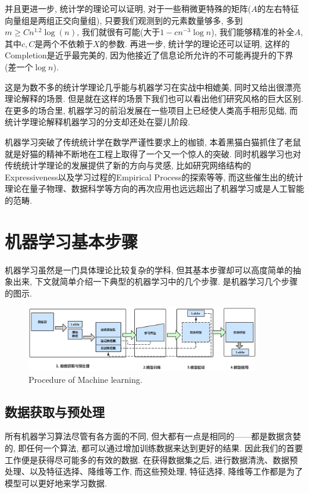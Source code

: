 \documentclass[lang=cn,11pt,a4paper]{elegantpaper}
\begin{document}
 \par 并且更进一步, 统计学的理论可以证明, 对于一些稍微更特殊的矩阵($A$的左右特征向量组是两组正交向量组), 只要我们观测到的元素数量够多, 多到$m\geq C n^{1.2} \log(n)$, 我们就很有可能(大于$1-cn^{-3}\log n$), 我们能够精准的补全$A$, 其中$c,C$是两个不依赖于$X$的参数\cite{Candes2009}. 再进一步, 统计学的理论还可以证明, 这样的Completion是近乎最完美的, 因为他接近了信息论所允许的不可能再提升的下界(差一个$\log n$)\cite{Candes2010}.
\par 这是为数不多的统计学理论几乎能与机器学习在实战中相媲美, 同时又给出很漂亮理论解释的场景. 但是就在这样的场景下我们也可以看出他们研究风格的巨大区别. 在更多的场合里, 机器学习的前沿发展在一些项目上已经使人类高手相形见绌, 而统计学理论解释机器学习的分支却还处在婴儿阶段. 
\par 机器学习突破了传统统计学在数学严谨性要求上的枷锁, 本着黑猫白猫抓住了老鼠就是好猫的精神不断地在工程上取得了一个又一个惊人的突破. 同时机器学习也对传统统计学理论的发展提供了新的方向与灵感, 比如研究网络结构的Expressiveness\cite{Yarotsky2017}以及学习过程的Empirical Process\cite{Vapnik1994}的探索等等, 而这些催生出的统计理论在量子物理、数据科学等方向的再次应用也远远超出了机器学习或是人工智能的范畴.
\section{机器学习基本步骤}
机器学习虽然是一门具体理论比较复杂的学科, 但其基本步骤却可以高度简单的抽象出来, 下文就简单介绍一下典型的机器学习中的几个步骤.  是机器学习几个步骤的图示.
\begin{figure}[htbp]
	\centering
	\includegraphics[width=0.9\textwidth]{555}
  	\caption{Procedure of Machine learning.\label{fig:buzhou}}
\end{figure}
\subsection{数据获取与预处理}
所有机器学习算法尽管有各方面的不同, 但大都有一点是相同的——都是数据贪婪的, 即任何一个算法, 都可以通过增加训练数据来达到更好的结果. 因此我们的首要工作便是获得尽可能多的有效的数据. 在获得数据集之后, 进行数据清洗、数据预处理、以及特征选择、降维等工作, 而这些预处理, 特征选择, 降维等工作都是为了模型可以更好地来学习数据.
\end{document}
